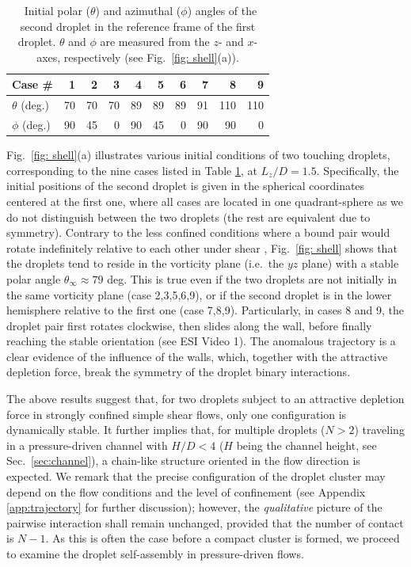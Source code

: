 \begin{table}[h]
  \centering
  \caption{\ Initial polar ($\theta$) and azimuthal ($\phi$) angles of the second droplet in the reference frame of the first droplet. $\theta$ and $\phi$ are measured from the $z$- and $x$-axes, respectively (see Fig.\ \ref{fig: shell}(a)).}
  \label{tbl: cases}
    \tabulinesep=1.2mm
    \begin{tabular}{ l rrrrrrrrr}
    \hline
    Case \# & 1&2&3&4&5&6&7&8&9 \\
    \hline
    $\theta$ (deg.) & 70&70&70& 89&89&89& 91& 110&110 \\
    $\phi$   (deg.) & 90&45& 0& 90&45& 0& 90&  90&  0 \\
    \hline
  \end{tabular}
\end{table}

Fig.\ \ref{fig: shell}(a) illustrates various initial conditions of two touching droplets, corresponding to the nine cases listed in Table \ref{tbl: cases}, at $L_z/D=1.5$. Specifically, the initial positions of the second droplet is given in the spherical coordinates centered at the first one, where all cases are located in one quadrant-sphere as we do not distinguish between the two droplets (the rest are equivalent due to symmetry). Contrary to the less confined conditions where a bound pair would rotate indefinitely relative to each other under shear \citep{batchelor_green_1972,Zinchenko1984}, Fig.\ \ref{fig: shell} shows that the droplets tend to reside in the vorticity plane (i.e.\ the $yz$ plane) with a stable polar angle $\theta_\infty \approx 79$ deg. This is true even if the two droplets are not initially in the same vorticity plane (case 2,3,5,6,9), or if the second droplet is in the lower hemisphere relative to the first one (case 7,8,9). Particularly, in cases 8 and 9, the droplet pair first rotates clockwise, then slides along the wall, before finally reaching the stable orientation (see ESI Video 1). The anomalous trajectory is a clear evidence of the influence of the walls, which, together with the attractive depletion force, break the symmetry of the droplet binary interactions.

The above results suggest that, for two droplets subject to an attractive depletion force in strongly confined simple shear flows, only one configuration is dynamically stable. It further implies that, for multiple droplets ($N>2$) traveling in a pressure-driven channel with $H/D<4$ ($H$ being the channel height, see Sec.\ \ref{sec:channel}), a chain-like structure oriented in the flow direction is expected. We remark that the precise configuration of the droplet cluster may depend on the flow conditions and the level of confinement (see Appendix \ref{app:trajectory} for further discussion); however, the \textit{qualitative} picture of the pairwise interaction shall remain unchanged, provided that the number of contact is $N-1$. As this is often the case before a compact cluster is formed, we proceed to examine the droplet self-assembly in pressure-driven flows.


